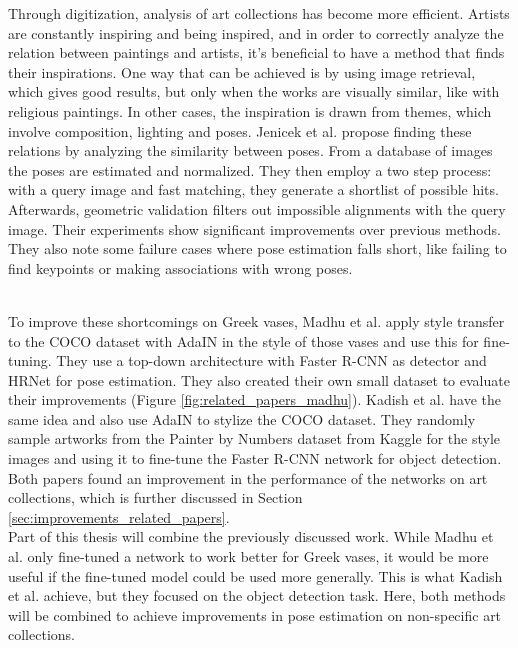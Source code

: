 Through digitization, analysis of art collections has become more efficient.
Artists are constantly inspiring and being inspired, and in order to correctly analyze the relation between paintings and artists, it's beneficial to have a method that finds their inspirations.
One way that can be achieved is by using image retrieval, which gives good results, but only when the works are visually similar, like with religious paintings.
In other cases, the inspiration is drawn from themes, which involve composition, lighting and poses.
Jenicek et al. \cite{Jenicek2019} propose finding these relations by analyzing the similarity between poses.
From a database of images the poses are estimated and normalized.
They then employ a two step process: with a query image and fast matching, they generate a shortlist of possible hits.
Afterwards, geometric validation filters out impossible alignments with the query image.
Their experiments show significant improvements over previous methods.
They also note some failure cases where pose estimation falls short, like failing to find keypoints or making associations with wrong poses.
\\
\\

\begin{figure}[h]
	\centering
\end{figure}

To improve these shortcomings on Greek vases, Madhu et al. \cite{Madhu2020} apply style transfer to the COCO dataset with AdaIN in the style of those vases and use this for fine-tuning.
They use a top-down architecture with Faster R-CNN as detector and HRNet for pose estimation.
They also created their own small dataset to evaluate their improvements (Figure \ref{fig:related_papers_madhu}).
Kadish et al. \cite{Kadish2021} have the same idea and also use AdaIN to stylize the COCO dataset.
They randomly sample artworks from the Painter by Numbers dataset from Kaggle \cite{PainterByNumbers} for the style images and using it to fine-tune the Faster R-CNN network for object detection.
Both papers found an improvement in the performance of the networks on art collections, which is further discussed in Section \ref{sec:improvements_related_papers}.
\\

Part of this thesis will combine the previously discussed work.
While Madhu et al. only fine-tuned a network to work better for Greek vases, it would be more useful if the fine-tuned model could be used more generally.
This is what Kadish et al. achieve, but they focused on the object detection task.
Here, both methods will be combined to achieve improvements in pose estimation on non-specific art collections.